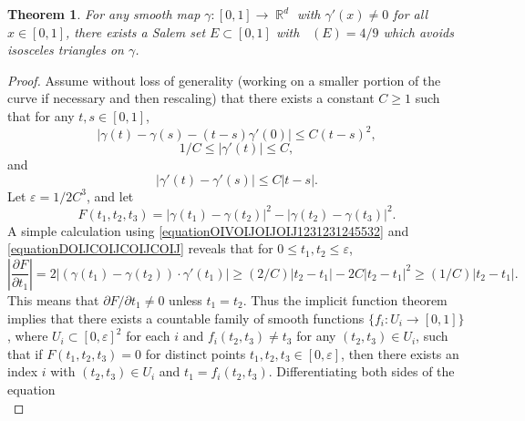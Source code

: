 \documentclass[dvipsnames,letterpaper,12pt]{article}
\numberwithin{equation}{section}
\DeclareMathOperator{\fordim}{\dim_{\mathbb{F}}}
\DeclareMathOperator{\RR}{\mathbb{R}}
\newtheorem{theorem}{Theorem}
\numberwithin{theorem}{section}
\begin{document}
\begin{theorem}
    For any smooth map $\gamma: [0,1] \to \RR^d$ with $\gamma'(x) \neq 0$ for all $x \in [0,1]$, there exists a Salem set $E \subset [0,1]$ with $\fordim(E) = 4/9$ which avoids isosceles triangles on $\gamma$.
\end{theorem}
\begin{proof}
    Assume without loss of generality (working on a smaller portion of the curve if necessary and then rescaling) that there exists a constant $C \geq 1$ such that for any $t,s \in [0,1]$,
    \begin{equation} \label{equationOIVOIJOIJOIJ1231231245532}
        |\gamma(t) - \gamma(s) - (t - s)\gamma'(0)| \leq C (t - s)^2,
    \end{equation}
    \begin{equation} \label{equationDOIJCOIJCOIJCOIJ}
        1/C \leq |\gamma'(t)| \leq C,
    \end{equation}
    and
    \begin{equation} \label{equationCIOJAOIVJVOIJioj1312421541}
        |\gamma'(t) - \gamma'(s)| \leq C |t - s|.
    \end{equation}
    Let $\varepsilon = 1/2C^3$, and let
    \begin{equation}
        F(t_1,t_2,t_3) = |\gamma(t_1) - \gamma(t_2)|^2 - |\gamma(t_2) - \gamma(t_3)|^2.
    \end{equation}
    A simple calculation using \eqref{equationOIVOIJOIJOIJ1231231245532} and \eqref{equationDOIJCOIJCOIJCOIJ} reveals that for $0 \leq t_1,t_2 \leq \varepsilon$,
    \begin{equation} \label{equationCOIJAWOIJCAWOIJWOAI2112412}
        \left| \frac{\partial F}{\partial t_1} \right| = 2 \left| (\gamma(t_1) - \gamma(t_2)) \cdot \gamma'(t_1) \right| \geq (2/C) |t_2 - t_1| - 2C |t_2 - t_1|^2 \geq (1/C) |t_2 - t_1|.
    \end{equation}
    This means that $\partial F / \partial t_1 \neq 0$ unless $t_1 = t_2$. Thus the implicit function theorem implies that there exists a countable family of smooth functions $\{ f_i: U_i \to [0,1] \}$, where $U_i \subset [0,\varepsilon]^2$ for each $i$ and $f_i(t_2,t_3) \neq t_3$ for any $(t_2,t_3) \in U_i$, such that if $F(t_1,t_2,t_3) = 0$ for distinct points $t_1,t_2,t_3 \in [0,\varepsilon]$, then there exists an index $i$ with $(t_2,t_3) \in U_i$ and $t_1 = f_i(t_2,t_3)$. Differentiating both sides of the equation
    \begin{equation}

\end{equation}
\end{proof}
\end{document}
